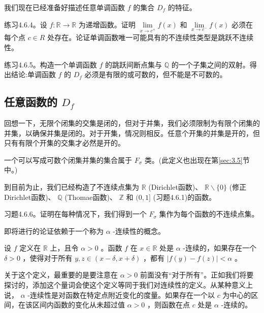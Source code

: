 我们现在已经准备好描述任意单调函数 \(f\) 的集合 \({D}_{f}\) 的特征。

练习4.6.4。设 \(f : \mathbb{R} \rightarrow  \mathbb{R}\) 为递增函数。证明 \(\mathop{\lim }\limits_{{x \rightarrow  {c}^{ + }}}f\left( x\right)\) 和 \(\mathop{\lim }\limits_{{x \rightarrow  {c}^{ - }}}f\left( x\right)\) 必须在每个点 \(c \in  R\) 处存在。论证单调函数唯一可能具有的不连续性类型是跳跃不连续性。

练习4.6.5。构造一个单调函数 \(f\) 的跳跃间断点集与 \(\mathbb{Q}\) 的一个子集之间的双射。得出结论:单调函数 \(f\) 的 \({D}_{f}\) 必须是有限的或可数的，但不能是不可数的。



\subsection{任意函数的 \({D}_{f}\)}

回想一下，无限个闭集的交集是闭的，但对于并集，我们必须限制为有限个闭集的并集，以确保并集是闭的。对于开集，情况则相反。任意个开集的并集是开的，但只有有限个开集的交集才必然是开的。

\begin{Def}
  \label{def:4.6.4}
  一个可以写成可数个闭集并集的集合属于 \({F}_{\sigma }\) 类。(此定义也出现在第\ref{sec:3.5}节中。)
\end{Def}

到目前为止，我们已经构造了不连续点集为 \(\mathbb{R}\) (Dirichlet函数)、 \(\mathbb{R} \smallsetminus  \{ 0\}\) (修正Dirichlet函数)、 \(\mathbb{Q}\) (Thomae函数)、 \(\mathbb{Z}\) 和 \((0,1\rbrack\) (习题4.6.1)的函数。

习题4.6.6。证明在每种情况下，我们得到一个 \({F}_{\sigma }\) 集作为每个函数的不连续点集。

即将进行的论证依赖于一个称为 \(\alpha\) -连续性的概念。

\begin{Def}
  \label{def:4.6.5}
  设 \(f\) 定义在 \(\mathbb{R}\) 上，且令 \(\alpha  > 0\) 。函数 \(f\) 在 \(x \in  \mathbb{R}\) 处是 \(\alpha\) -连续的，如果存在一个 \(\delta  > 0\) ，使得对于所有 \(y,z \in  \left( {x - \delta ,x + \delta }\right)\) ，都有 \(\left| {f\left( y\right)  - f\left( z\right) }\right|  < \alpha\) 。
\end{Def}

关于这个定义，最重要的是要注意在 \(\alpha  > 0\) 前面没有“对于所有”。正如我们将要探讨的，添加这个量词会使这个定义等同于我们对连续性的定义。从某种意义上说， \(\alpha\) -连续性是对函数在特定点附近变化的度量。如果存在一个以 \(c\) 为中心的区间，在该区间内函数的变化从未超过值 \(\alpha  > 0\) ，则函数在点 \(c\) 处是 \(\alpha\) -连续的。


